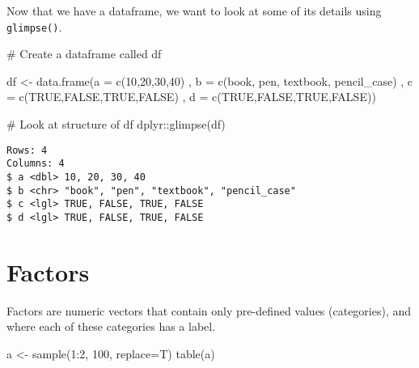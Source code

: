 \documentclass[
  letterpaper,
  DIV=11,
  numbers=noendperiod]{scrreprt}
\newenvironment{Shaded}{\begin{snugshade}}{\end{snugshade}}
\newcommand{\AttributeTok}[1]{\textcolor[rgb]{0.40,0.45,0.13}{#1}}
\newcommand{\CommentTok}[1]{\textcolor[rgb]{0.37,0.37,0.37}{#1}}
\newcommand{\ConstantTok}[1]{\textcolor[rgb]{0.56,0.35,0.01}{#1}}
\newcommand{\DecValTok}[1]{\textcolor[rgb]{0.68,0.00,0.00}{#1}}
\newcommand{\FunctionTok}[1]{\textcolor[rgb]{0.28,0.35,0.67}{#1}}
\newcommand{\NormalTok}[1]{\textcolor[rgb]{0.00,0.23,0.31}{#1}}
\newcommand{\OtherTok}[1]{\textcolor[rgb]{0.00,0.23,0.31}{#1}}
\newcommand{\SpecialCharTok}[1]{\textcolor[rgb]{0.37,0.37,0.37}{#1}}
\newcommand{\StringTok}[1]{\textcolor[rgb]{0.13,0.47,0.30}{#1}}
\begin{document}
Now that we have a dataframe, we want to look at some of its details
using \texttt{glimpse()}.

\begin{Shaded}
\begin{Highlighting}[]
\CommentTok{\# Create a dataframe called df}

\NormalTok{df }\OtherTok{\textless{}{-}} \FunctionTok{data.frame}\NormalTok{(}\AttributeTok{a =} \FunctionTok{c}\NormalTok{(}\DecValTok{10}\NormalTok{,}\DecValTok{20}\NormalTok{,}\DecValTok{30}\NormalTok{,}\DecValTok{40}\NormalTok{)}
\NormalTok{                 , }\AttributeTok{b =} \FunctionTok{c}\NormalTok{(}\StringTok{\textquotesingle{}book\textquotesingle{}}\NormalTok{, }\StringTok{\textquotesingle{}pen\textquotesingle{}}\NormalTok{, }\StringTok{\textquotesingle{}textbook\textquotesingle{}}\NormalTok{, }\StringTok{\textquotesingle{}pencil\_case\textquotesingle{}}\NormalTok{)}
\NormalTok{                 , }\AttributeTok{c =} \FunctionTok{c}\NormalTok{(}\ConstantTok{TRUE}\NormalTok{,}\ConstantTok{FALSE}\NormalTok{,}\ConstantTok{TRUE}\NormalTok{,}\ConstantTok{FALSE}\NormalTok{)}
\NormalTok{                 , }\AttributeTok{d =} \FunctionTok{c}\NormalTok{(}\ConstantTok{TRUE}\NormalTok{,}\ConstantTok{FALSE}\NormalTok{,}\ConstantTok{TRUE}\NormalTok{,}\ConstantTok{FALSE}\NormalTok{))}

\CommentTok{\# Look at structure of df}
\NormalTok{dplyr}\SpecialCharTok{::}\FunctionTok{glimpse}\NormalTok{(df)}
\end{Highlighting}
\end{Shaded}

\begin{verbatim}
Rows: 4
Columns: 4
$ a <dbl> 10, 20, 30, 40
$ b <chr> "book", "pen", "textbook", "pencil_case"
$ c <lgl> TRUE, FALSE, TRUE, FALSE
$ d <lgl> TRUE, FALSE, TRUE, FALSE
\end{verbatim}

\section{Factors}\label{factors}

Factors are numeric vectors that contain only pre-defined values
(categories), and where each of these categories has a label.

\begin{Shaded}
\begin{Highlighting}[]
\NormalTok{a }\OtherTok{\textless{}{-}} \FunctionTok{sample}\NormalTok{(}\DecValTok{1}\SpecialCharTok{:}\DecValTok{2}\NormalTok{, }\DecValTok{100}\NormalTok{, }\AttributeTok{replace=}\NormalTok{T)}
\FunctionTok{table}\NormalTok{(a)}
\end{Highlighting}
\end{Shaded}
\end{document}
